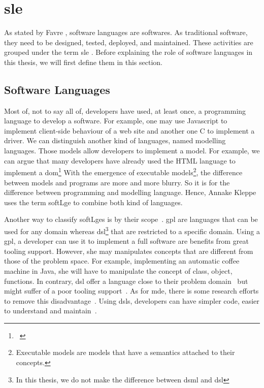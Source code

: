 \section[Software Language Engineering]{\glsdesc{sle}}
\label{sec:back:sle}

As stated by Favre \etal \cite{DBLP:conf/sle/FavreGLP10}, software languages are softwares.
As traditional software, they need to be designed, tested, deployed, and maintained.
These activities are grouped under the term \gls{sle} \cite{kleppe2008software}.
Before explaining the role of software languages in this thesis, we will first define them in this section.

\subsection{Software Languages}

Most of, not to say all of, developers have used, at least once, a programming language to develop a software.
For example, one may use Javascript to implement client-side behaviour of a web site and another one C to implement a driver.
We can distinguish another kind of languages, named modelling languages.
Those models allow developers to implement a model.
For example, we can argue that many developers have already used the HTML language to implement a \gls{dom}\footnote{~\cite{DOM:Spec}}
With the emergence of executable models\footnote{Executable models are models that have a semantics attached to their concepts.}, the difference between models and programs are more and more blurry.
So it is for the difference between programming and modelling language.
Hence, Annake Kleppe uses the term \gls{softLge} to combine both kind of languages.

Another way to classify \glspl{softLge} is by their scope~\cite{DBLP:journals/sigplan/DeursenKV00}.
\Gls{gpl} are languages that can be used for any domain whereas \gls{dsl}\footnote{In this thesis, we do not make the difference between \gls{dsml} and \gls{dsl}} that are restricted to a specific domain.
Using a \gls{gpl}, a developer can use it to implement a full software are benefits from great tooling support. 
However, she may manipulates concepts that are different from those of the problem space.
For example, implementing an automatic coffee machine in Java, she will have to manipulate the concept of class, object, functions.
In contrary, \gls{dsl} offer a language close to their problem domain~\cite{DBLP:journals/smr/DeursenK98} but might suffer of a poor tooling support~\cite{voelter2014generic}.
As for \gls{mde}, there is some research efforts to remove this disadvantage~\cite{DBLP:journals/jss/BousseLCWB18}. 
Using \glspl{dsl}, developers can have simpler code, easier to understand and maintain~\cite{DBLP:journals/sigplan/DeursenKV00, DBLP:journals/smr/DeursenK98}.

